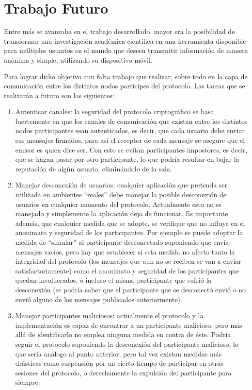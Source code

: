 \chapter{Trabajo Futuro}\label{cap6}

Entre más se avanzaba en el trabajo desarrollado, mayor era la posibilidad de transformar
una investigación académica-científica en una herramienta disponible para múltiples
usuarios en el mundo que deseen transmitir información de manera anónima y simple, 
utilizando su dispositivo móvil.

Para lograr dicho objetivo aun falta trabajo que realizar, sobre todo en la capa de
comunicación entre los distintos nodos partícipes del protocolo. Las tareas que se
realizarán a futuro son las siguientes:

\begin{enumerate}
    \item Autenticar canales: la seguridad del protocolo criptográfico se basa fuertemente
    en que los canales de comunicación que existan entre los distintos nodos participantes
    sean autenticados, es decir, que cada usuario debe enviar sus mensajes firmados, para
    así el receptor de cada mensaje se asegure que el emisor es quien dice ser. Con esto
    se evitan participantes impostores, es decir, que se hagan pasar por otro 
    participante, lo que podría resultar en bajar la reputación de algún usuario,
    eliminándolo de la sala.
    
    \item Manejar desconexión de usuarios: cualquier aplicación que pretenda ser utilizada
    en ambientes ``reales'' debe manejar la posible desconexión de usuarios en cualquier 
    momento del protocolo. Actualmente esto no es manejado y simplemente la aplicación 
    deja de funcionar. Es importante además, que cualquier medida que se adopte, se 
    verifique que no influye en el anonimato y seguridad de los participantes. Por 
    ejemplo se puede adoptar la medida de ``simular'' al participante desconectado 
    suponiendo que envía mensajes vacíos, pero hay que establecer si esta medida no 
    afecta tanto la integridad del protocolo (los mensajes que aun no se reciben 
    se van a enviar satisfactoriamente) como el anonimato y seguridad de los 
    participantes que quedan involucrados, o incluso el mismo participante que sufrió 
    la desconexión (se podría saber que el participante que se desconectó envió o no 
    envió alguno de los mensajes publicados anteriormente).
    
    \item Manejar participantes maliciosos: actualmente el protocolo y la implementación 
    es capaz de encontrar a un participante malicioso, pero más allá de identificarlo 
    no emplea ninguna medida en contra de éste. Podría seguir el protocolo suponiendo 
    la desconexión del participante malicioso, lo que sería análogo al punto anterior, 
    pero tal vez existan medidas más drásticas como suspensión por un cierto tiempo 
    de participar en otras sesiones del protocolo, o derechamente la expulsión del 
    participante para siempre. 
    

\end{enumerate}
